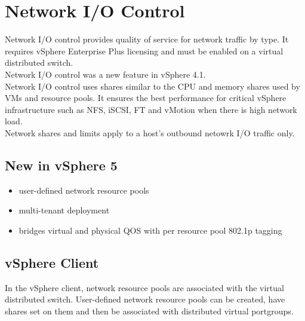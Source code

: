 \section{Network I/O Control}

Network I/O control provides quality of service for network traffic by type.
It requires vSphere Enterprise Plus licensing and must be enabled on a
virtual distributed switch.\\

Network I/O control was a new feature in vSphere 4.1.\\

Network I/O control uses shares similar to the CPU and memory shares used
by VMs and resource pools. It ensures the best performance for critical
vSphere infrastructure such as NFS, iSCSI, FT and vMotion when there is
high network load.\\

Network shares and limits apply to a host's outbound netowrk I/O traffic
only.

\subsection{New in vSphere 5}

\begin{itemize}
\item user-defined network resource pools
\item multi-tenant deployment
\item bridges virtual and physical QOS with per resource pool 802.1p tagging
\end{itemize}

\subsection{vSphere Client}

In the vSphere client, network resource pools are associated with the virtual
distributed switch. User-defined network resource pools can be created,
have shares set on them and then be associated with distributed virtual
portgroups.

